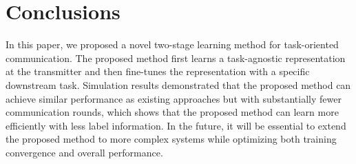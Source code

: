 \section{Conclusions}
\label{sec:conclusion}
In this paper, we proposed a novel two-stage learning method for task-oriented communication. The proposed method first learns a task-agnostic representation at the transmitter and then fine-tunes the representation with a specific downstream task. 
Simulation results demonstrated that the proposed method can achieve similar performance as existing approaches but with substantially fewer communication rounds, which shows that the proposed method can learn more efficiently with less label information. In the future, it will be essential to extend the proposed method to more complex systems while optimizing both training convergence and overall performance.